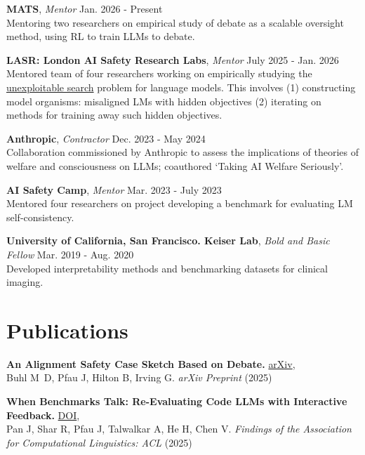 \documentclass[11pt,letterpaper]{article}
\begin{document}
\textbf{MATS}, \textit{Mentor} \hfill Jan. 2026 - Present\\
Mentoring two researchers on empirical study of debate as a scalable oversight method, using RL to train LLMs to debate.
\vspace{4pt}

\textbf{LASR: London AI Safety Research Labs}, \textit{Mentor} \hfill July 2025 - Jan. 2026\\
Mentored team of four researchers working on empirically studying the \href{https://www.alignmentforum.org/posts/CuneN5HmLnztsLRzD/unexploitable-search-blocking-malicious-use-of-free-1}{unexploitable search} problem for language models. This involves (1) constructing model organisms: misaligned LMs with hidden objectives (2) iterating on methods for training away such hidden objectives.
\vspace{4pt}


\textbf{Anthropic}, \textit{Contractor} \hfill Dec. 2023 - May 2024\\
Collaboration commissioned by Anthropic to assess the implications of theories of welfare and consciousness on LLMs; coauthored `Taking AI Welfare Seriously'.
\vspace{4pt}

\textbf{AI Safety Camp}, \textit{Mentor} \hfill Mar. 2023 - July 2023\\
Mentored four researchers on project developing a benchmark for evaluating LM self-consistency.
\vspace{4pt}

\textbf{University of California, San Francisco. Keiser Lab}, \textit{Bold and Basic Fellow} \hfill Mar. 2019 - Aug. 2020\\
Developed interpretability methods and benchmarking datasets for clinical imaging. 

\section{Publications}

\textbf{An Alignment Safety Case Sketch Based on Debate.}
\href{https://doi.org/10.48550/arXiv.2505.03989}{arXiv},\\
Buhl M\, D, Pfau J, Hilton B, Irving G. \textit{arXiv Preprint} (2025)
\vspace{3pt}

\textbf{When Benchmarks Talk: Re-Evaluating Code LLMs with Interactive Feedback.}
\href{https://doi.org/10.18653/v1/2025.findings-acl.1267}{DOI},\\
Pan J, Shar R, Pfau J, Talwalkar A, He H, Chen V. \textit{Findings of the Association for Computational Linguistics: ACL} (2025)
\vspace{3pt}
\end{document}
